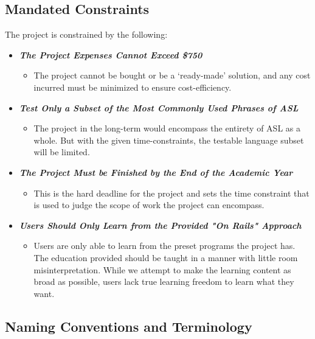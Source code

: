 \documentclass[12pt, titlepage]{article}
\begin{document}
\subsection{Mandated Constraints}

The project is constrained by the following:

\begin{itemize}
    \item[] \textbf{\textit{The Project Expenses Cannot Exceed \$750}}
    \begin{itemize}
        \item The project cannot be bought or be a `ready-made' solution, and any cost incurred must be minimized to ensure cost-efficiency.
    \end{itemize}
    \item[] \textbf{\textit{Test Only a Subset of the Most Commonly Used Phrases of ASL}}
    \begin{itemize}
        \item The project in the long-term would encompass the entirety of ASL as a whole. But with the given time-constraints, the testable language subset will be limited.
    \end{itemize}
    \item[] \textbf{\textit{The Project Must be Finished by the End of the Academic Year}}
    \begin{itemize}
        \item This is the hard deadline for the project and sets the time constraint that is used to judge the scope of work the project can encompass.
    \end{itemize}
    \item[] \textbf{\textit{Users Should Only Learn from the Provided "On Rails" Approach}}
    \begin{itemize}
        \item Users are only able to learn from the preset programs the project has. The education provided should be taught in a manner with little room misinterpretation. While we attempt to make the learning content as broad as possible, users lack true learning freedom to learn what they want.
    \end{itemize}
\end{itemize}

\subsection{Naming Conventions and Terminology}
\end{document}
